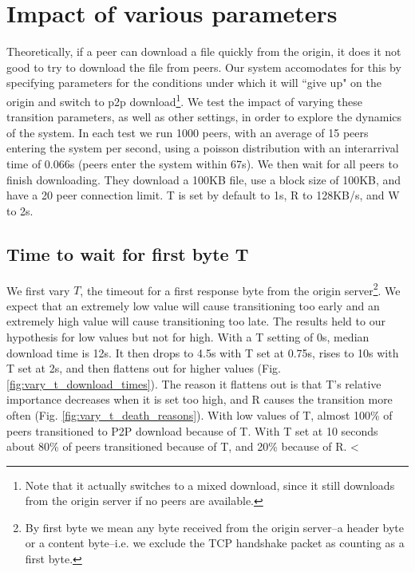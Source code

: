 \section{Impact of various parameters}

Theoretically, if a peer can download a file quickly from the origin, it does it not good to try to download the file from 
peers. Our system accomodates for this by specifying parameters for the conditions under which it will 
``give up" on the origin and switch to p2p download\footnote{Note that it actually switches to 
a mixed download, since it still downloads from the origin server if no peers are available.}. We 
test the impact of varying these transition parameters, as well as other settings, in order 
to explore the dynamics of the system. In each test we run 1000 peers, with an average of 15 peers entering 
the system per second, using a poisson distribution with an interarrival time of 0.066s (peers enter the system within 67s). 
We then wait for all peers to finish downloading. They download a 100KB file, use a block size of 100KB, and have a 20 peer
connection limit. T is set by default to 1s, R to 128KB/s, and W to 2s. 

\subsection{Time to wait for first byte T}

We first vary $T$, the timeout for a first response byte from the origin server\footnote{By 
first byte we mean any byte received from the origin server--a header byte or a content byte--i.e. 
we exclude the TCP handshake packet as counting as a first byte.}. We expect that an extremely low value 
will cause transitioning too early and an extremely high value 
will cause transitioning too late. The results held to our hypothesis for low values but not for 
high. With a T setting of 0s, median download time is 12s. It then drops to 4.5s with T set at 0.75s, 
rises to 10s with T set at 2s, and then flattens out for higher values (Fig. \ref{fig:vary_t_download_times}). 
The reason it flattens out is that T's relative importance decreases when it 
is set too high, and R causes the transition more often (Fig. \ref{fig:vary_t_death_reasons}). With 
low values of T, almost 100\% of peers transitioned to P2P download because of T. With T set at 10 seconds 
about 80\% of peers transitioned because of T, and 20\% because of R. 
<%

